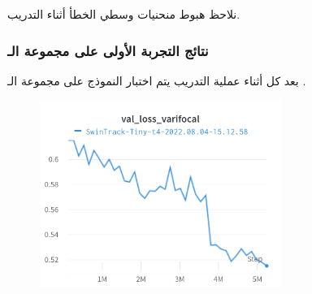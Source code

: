 نلاحظ هبوط منحنيات وسطي الخطأ أثناء التدريب.
\subsubsection{ نتائج التجربة الأولى على مجموعة الـ
}
بعد كل 
أثناء عملية التدريب يتم اختبار النموذج على مجموعة الـ
.

\begin{figure}[H]
	\centerline{\includegraphics[width=0.7\textwidth]{charts/Section-2-Panel-1-5x2brafi7}}
	\caption{
	}
\end{figure}

